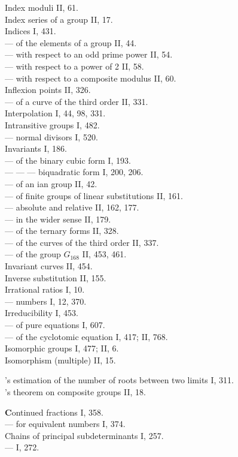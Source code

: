 Index moduli II, 61.\\
Index series of a group II, 17.\\
Indices I, 431.\\
--- of the elements of a group II, 44.\\
--- with respect to an odd prime power II, 54.\\
--- with respect to a power of 2 II, 58.\\
--- with respect to a composite modulus II, 60.\\
Inflexion points II, 326.\\
--- of a curve of the third order II, 331.\\
Interpolation I, 44, 98, 331.\\
Intransitive groups I, 482.\\
--- normal divisors I, 520.\\
Invariants I, 186.\\
--- of the binary cubic form I, 193.\\
--- --- --- biquadratic form I, 200, 206.\\
--- of an ian group II, 42.\\
--- of finite groups of linear substitutions II, 161.\\
--- absolute and relative II, 162, 177.\\
--- in the wider sense II, 179.\\
--- of the ternary forms II, 328.\\
--- of the curves of the third order II, 337.\\
--- of the group $G_{168}$ II, 453, 461.\\
Invariant curves II, 454.\\
Inverse substitution II, 155.\\
Irrational ratios I, 10.\\
--- numbers I, 12, 370.\\
Irreducibility I, 453.\\
--- of pure equations I, 607.\\
--- of the cyclotomic equation I, 417; II, 768.\\
Isomorphic groups I, 477; II, 6.\\
Isomorphism (multiple) II, 15.

\medskip
\noindent
{}'s estimation of the number of roots between two limits I, 311.\\
's theorem on composite groups II, 18.

\medskip
\noindent
\textbf{C}ontinued fractions I, 358.\\
--- for equivalent numbers I, 374.\\
Chains of principal subdeterminants I, 257.\\
---  I, 272.
